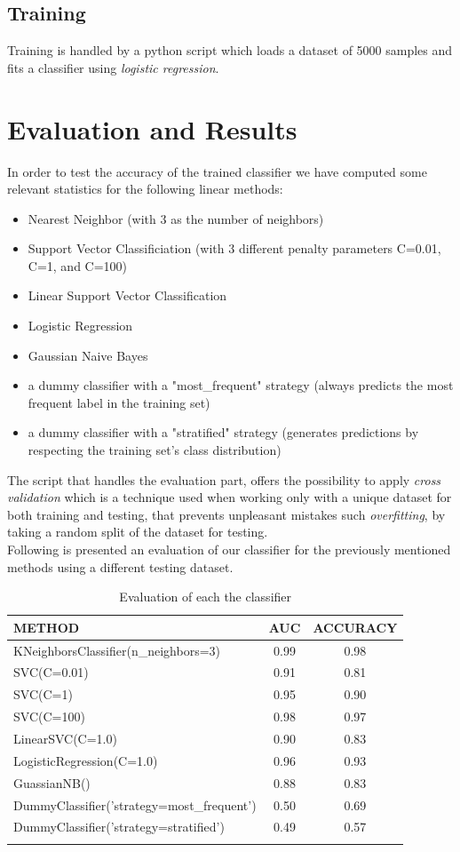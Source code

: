 \documentclass[]{usiinfbachelorproject}
\begin{document}
\subsection{Training}
Training is handled by a python script which loads a dataset of 5000 samples and fits a classifier using \textit{logistic regression}.
\newpage
\section{Evaluation and Results}
In order to test the accuracy of the trained classifier we have computed some relevant statistics for the following linear methods:
\begin{itemize}
    \item Nearest Neighbor (with 3 as the number of neighbors)
    \item Support Vector Classificiation (with 3 different penalty parameters C=0.01, C=1, and C=100)
    \item Linear Support Vector Classification
    \item Logistic Regression
    \item Gaussian Naive Bayes
    \item a dummy classifier with a "most\_frequent" strategy (always predicts the most frequent label in the training set)
    \item a dummy classifier with a "stratified" strategy (generates predictions by respecting the training set's class distribution)
\end{itemize}
The script that handles the evaluation part, offers the possibility to apply \textit{cross validation} which is a technique used when working only with a unique dataset for both training
and testing, that prevents unpleasant mistakes such \textit{overfitting}, by taking a random split of the dataset for testing. \\
Following is presented an evaluation of our classifier for the previously mentioned methods using a different testing dataset.
\begin{longtabu}{| l | c | c |}
\rowfont{\bfseries}
    \hline
    METHOD & AUC & ACCURACY \\
    \hline
    KNeighborsClassifier(n\_neighbors=3) & 0.99 & 0.98 \\
    SVC(C=0.01) & 0.91 & 0.81\\
    SVC(C=1) & 0.95 & 0.90 \\
    SVC(C=100) & 0.98 & 0.97 \\
    LinearSVC(C=1.0) & 0.90 & 0.83 \\
    LogisticRegression(C=1.0) & 0.96 & 0.93 \\
    GuassianNB() & 0.88 & 0.83 \\
    DummyClassifier('strategy=most\_frequent') & 0.50 & 0.69 \\
    DummyClassifier('strategy=stratified') & 0.49 & 0.57 \\
    \hline
\caption{Evaluation of each the classifier}
\label{table:datatest}
\end{longtabu}
\end{document}
